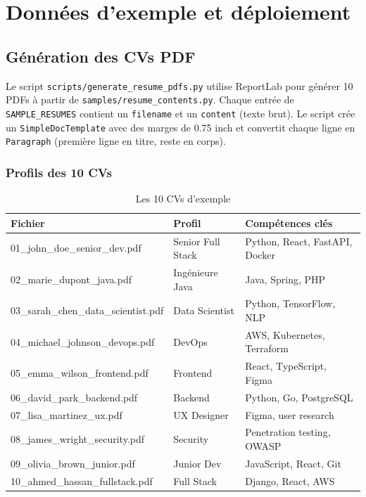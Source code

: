 \documentclass[11pt,a4paper]{report}
\begin{document}
\chapter{Données d'exemple et déploiement}

\section{Génération des CVs PDF}

Le script \texttt{scripts/generate\_resume\_pdfs.py} utilise ReportLab pour générer 10 PDFs à partir de \texttt{samples/resume\_contents.py}. Chaque entrée de \texttt{SAMPLE\_RESUMES} contient un \texttt{filename} et un \texttt{content} (texte brut). Le script crée un \texttt{SimpleDocTemplate} avec des marges de 0.75 inch et convertit chaque ligne en \texttt{Paragraph} (première ligne en titre, reste en corps).

\subsection{Profils des 10 CVs}

\begin{table}[H]
  \centering
  \caption{Les 10 CVs d'exemple}
  \small
  \begin{tabular}{@{}llp{5cm}@{}}
    \toprule
    \textbf{Fichier} & \textbf{Profil} & \textbf{Compétences clés} \\
    \midrule
    01\_john\_doe\_senior\_dev.pdf & Senior Full Stack & Python, React, FastAPI, Docker \\
    02\_marie\_dupont\_java.pdf & Ingénieure Java & Java, Spring, PHP \\
    03\_sarah\_chen\_data\_scientist.pdf & Data Scientist & Python, TensorFlow, NLP \\
    04\_michael\_johnson\_devops.pdf & DevOps & AWS, Kubernetes, Terraform \\
    05\_emma\_wilson\_frontend.pdf & Frontend & React, TypeScript, Figma \\
    06\_david\_park\_backend.pdf & Backend & Python, Go, PostgreSQL \\
    07\_lisa\_martinez\_ux.pdf & UX Designer & Figma, user research \\
    08\_james\_wright\_security.pdf & Security & Penetration testing, OWASP \\
    09\_olivia\_brown\_junior.pdf & Junior Dev & JavaScript, React, Git \\
    10\_ahmed\_hassan\_fullstack.pdf & Full Stack & Django, React, AWS \\
    \bottomrule
  \end{tabular}
\end{table}
\end{document}
